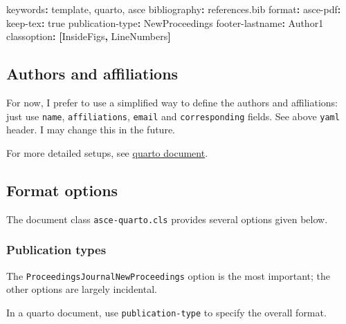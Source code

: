 \documentclass[NewProceedings, InsideFigs,LineNumbers]{asce-quarto}
\newenvironment{Shaded}{\begin{snugshade}}{\end{snugshade}}
\newcommand{\AttributeTok}[1]{\textcolor[rgb]{0.40,0.45,0.13}{#1}}
\newcommand{\CharTok}[1]{\textcolor[rgb]{0.13,0.47,0.30}{#1}}
\newcommand{\FunctionTok}[1]{\textcolor[rgb]{0.28,0.35,0.67}{#1}}
\newcommand{\KeywordTok}[1]{\textcolor[rgb]{0.00,0.23,0.31}{\textbf{#1}}}
\begin{document}
\begin{Shaded}
\begin{Highlighting}[]
\FunctionTok{keywords}\KeywordTok{:}\AttributeTok{ template, quarto, asce}
\FunctionTok{bibliography}\KeywordTok{:}\AttributeTok{ references.bib}
\FunctionTok{format}\KeywordTok{:}\AttributeTok{ }
\AttributeTok{  }\FunctionTok{asce{-}pdf}\KeywordTok{:}
\AttributeTok{    }\FunctionTok{keep{-}tex}\KeywordTok{:}\AttributeTok{ }\CharTok{true}
\AttributeTok{    }\FunctionTok{publication{-}type}\KeywordTok{:}\AttributeTok{ NewProceedings}
\AttributeTok{    }\FunctionTok{footer{-}lastname}\KeywordTok{:}\AttributeTok{ Author1}
\AttributeTok{    }\FunctionTok{classoption}\KeywordTok{:}\AttributeTok{ }\KeywordTok{[}\AttributeTok{InsideFigs}\KeywordTok{,}\AttributeTok{ LineNumbers}\KeywordTok{]}
\end{Highlighting}
\end{Shaded}

\subsection{Authors and affiliations}\label{authors-and-affiliations}

For now, I prefer to use a simplified way to define the authors and
affiliations: just use \texttt{name}, \texttt{affiliations},
\texttt{email} and \texttt{corresponding} fields. See above
\texttt{yaml} header. I may change this in the future.

For more detailed setups, see
\href{https://quarto.org/docs/journals/authors.html}{quarto document}.

\subsection{Format options}\label{format-options}

The document class \texttt{asce-quarto.cls} provides several options
given below.

\subsubsection{Publication types}\label{publication-types}

The \texttt{Proceedings\textbar{}Journal\textbar{}NewProceedings} option
is the most important; the other options are largely incidental.

In a quarto document, use \texttt{publication-type} to specify the
overall format.
\end{document}
